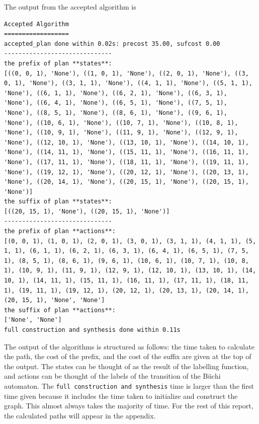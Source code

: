 The output from the accepted algorithm is

\begingroup
\fontsize{9pt}{12pt}\selectfont
\begin{lstlisting}
Accepted Algorithm
==================
accepted_plan done within 0.02s: precost 35.00, sufcost 0.00
------------------------------
the prefix of plan **states**:
[((0, 0, 1), 'None'), ((1, 0, 1), 'None'), ((2, 0, 1), 'None'), ((3, 0, 1), 'None'), ((3, 1, 1), 'None'), ((4, 1, 1), 'None'), ((5, 1, 1), 'None'), ((6, 1, 1), 'None'), ((6, 2, 1), 'None'), ((6, 3, 1), 'None'), ((6, 4, 1), 'None'), ((6, 5, 1), 'None'), ((7, 5, 1), 'None'), ((8, 5, 1), 'None'), ((8, 6, 1), 'None'), ((9, 6, 1), 'None'), ((10, 6, 1), 'None'), ((10, 7, 1), 'None'), ((10, 8, 1), 'None'), ((10, 9, 1), 'None'), ((11, 9, 1), 'None'), ((12, 9, 1), 'None'), ((12, 10, 1), 'None'), ((13, 10, 1), 'None'), ((14, 10, 1), 'None'), ((14, 11, 1), 'None'), ((15, 11, 1), 'None'), ((16, 11, 1), 'None'), ((17, 11, 1), 'None'), ((18, 11, 1), 'None'), ((19, 11, 1), 'None'), ((19, 12, 1), 'None'), ((20, 12, 1), 'None'), ((20, 13, 1), 'None'), ((20, 14, 1), 'None'), ((20, 15, 1), 'None'), ((20, 15, 1), 'None')]
the suffix of plan **states**:
[((20, 15, 1), 'None'), ((20, 15, 1), 'None')]
------------------------------
the prefix of plan **actions**:
[(0, 0, 1), (1, 0, 1), (2, 0, 1), (3, 0, 1), (3, 1, 1), (4, 1, 1), (5, 1, 1), (6, 1, 1), (6, 2, 1), (6, 3, 1), (6, 4, 1), (6, 5, 1), (7, 5, 1), (8, 5, 1), (8, 6, 1), (9, 6, 1), (10, 6, 1), (10, 7, 1), (10, 8, 1), (10, 9, 1), (11, 9, 1), (12, 9, 1), (12, 10, 1), (13, 10, 1), (14, 10, 1), (14, 11, 1), (15, 11, 1), (16, 11, 1), (17, 11, 1), (18, 11, 1), (19, 11, 1), (19, 12, 1), (20, 12, 1), (20, 13, 1), (20, 14, 1), (20, 15, 1), 'None', 'None']
the suffix of plan **actions**:
['None', 'None']
full construction and synthesis done within 0.11s
\end{lstlisting}
\endgroup

The output of the algorithms is structured as follows: the time taken to calculate the path, the cost of the prefix, and the cost of the suffix are given at the top of the output. The states can be thought of as the result of the labelling function, and actions can be thought of the labels of the transition of the B\"uchi automaton. The \texttt{full construction and synthesis} time is larger than the first time given because it includes the time taken to initialize and construct the graph. This almost always takes the majority of time. For the rest of this report, the calculated paths will appear in the appendix.%

